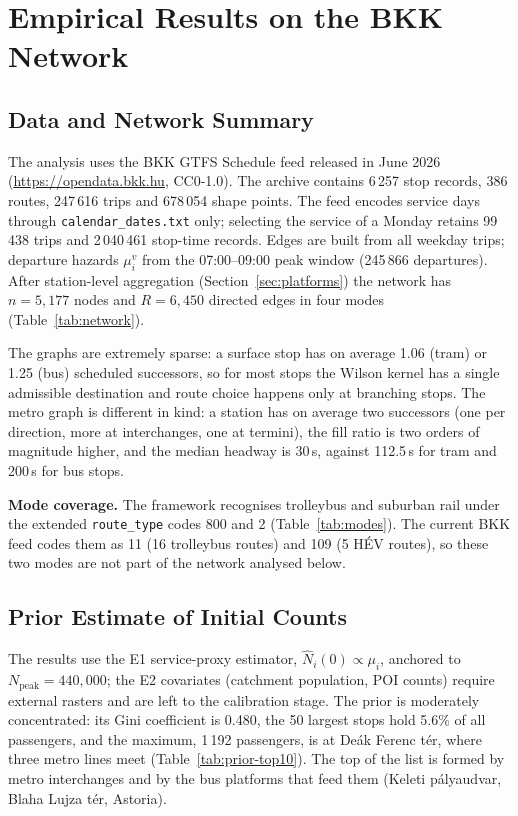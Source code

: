 \documentclass[12pt,a4paper]{article}
\theoremstyle{plain}
\theoremstyle{definition}
\theoremstyle{remark}
\begin{document}
\section{Empirical Results on the BKK Network}
\label{sec:results}

\subsection{Data and Network Summary}

The analysis uses the BKK GTFS Schedule feed released in June 2026
(\url{https://opendata.bkk.hu}, CC0-1.0).  The archive contains 6\,257 stop
records, 386 routes, 247\,616 trips and 678\,054 shape points.  The feed
encodes service days through \texttt{calendar\_dates.txt} only; selecting the
service of a Monday retains 99\,438 trips and 2\,040\,461 stop-time records.
Edges are built from all weekday trips; departure hazards $\mu^v_i$ from the
07:00--09:00 peak window (245\,866 departures).  After station-level
aggregation (Section~\ref{sec:platforms}) the network has $n=5{,}177$ nodes and
$R=6{,}450$ directed edges in four modes (Table~\ref{tab:network}).



The graphs are extremely sparse: a surface stop has on average 1.06 (tram) or
1.25 (bus) scheduled successors, so for most stops the Wilson kernel has a
single admissible destination and route choice happens only at branching
stops.  The metro graph is different in kind: a station has on average two
successors (one per direction, more at interchanges, one at termini), the fill
ratio is two orders of magnitude higher, and the median headway is 30\,s,
against 112.5\,s for tram and 200\,s for bus stops.

\textbf{Mode coverage.}  The framework recognises trolleybus and suburban rail
under the extended \texttt{route\_type} codes 800 and 2 (Table~\ref{tab:modes}).
The current BKK feed codes them as 11 (16 trolleybus routes) and 109 (5 H\'EV
routes), so these two modes are not part of the network analysed below.

\subsection{Prior Estimate of Initial Counts}

The results use the E1 service-proxy estimator, $\hat N_i(0)\propto\mu_i$,
anchored to $N_{\mathrm{peak}}=440{,}000$; the E2 covariates (catchment
population, POI counts) require external rasters and are left to the
calibration stage.  The prior is moderately concentrated: its Gini coefficient
is 0.480, the 50 largest stops hold 5.6\% of all passengers, and the maximum,
1\,192 passengers, is at De\'ak Ferenc t\'er, where three metro lines meet
(Table~\ref{tab:prior-top10}).  The top of the list is formed by metro
interchanges and by the bus platforms that feed them (Keleti p\'alyaudvar,
Blaha Lujza t\'er, Astoria).
\end{document}
